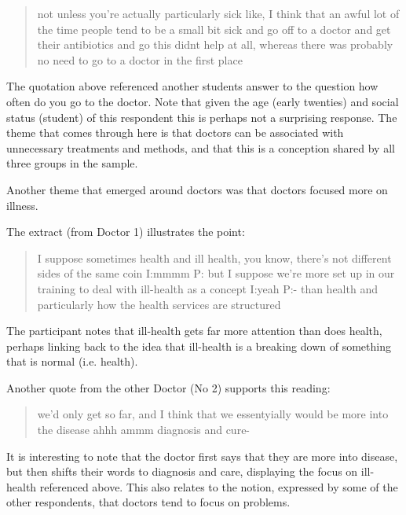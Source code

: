\begin{quotation}
not unless you're actually particularly sick like, I think that an awful lot of the time people tend to be a small bit sick and go off to a doctor and get their antibiotics and go this didnt help at all, whereas there was probably no need to go to a doctor in the first place 

\end{quotation}

The quotation above referenced another students answer to the question how often do you go to the doctor. Note that given the age (early twenties) and social status (student) of this respondent this is perhaps not a surprising response.  The theme that comes through here is that doctors can be associated with unnecessary treatments and methods, and that this is a conception shared by all three groups in the sample. 


Another theme that emerged around doctors was that doctors focused more on illness. 

The extract (from Doctor 1) illustrates the point: 

\begin{quotation}
  I suppose sometimes health and ill health, you know, there's not different sides of the same coin
I:mmmm
P: but I suppose we're more set up in our training to deal with ill-health as a concept
I:yeah
P:- than health and particularly how the health services are structured 

\end{quotation}

The participant notes that ill-health gets far more attention than does health, perhaps linking back to the idea that ill-health is a breaking down of something that is normal (i.e. health). 

Another quote from the other Doctor (No 2) supports this reading:

\begin{quotation}
  we'd only get so far, and I think that we essentyially would be more into the disease ahhh ammm diagnosis and cure-

\end{quotation}

It is interesting to note that the doctor first says that they are more into disease, but then shifts their words to diagnosis and care, displaying the focus on ill-health referenced above. This also relates to the notion, expressed by some of the other respondents, that doctors tend to focus on problems. 


